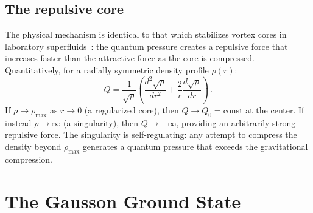 \documentclass[12pt, a4paper]{article}
\begin{document}
\subsection{The repulsive core}

The physical mechanism is identical to that which stabilizes vortex cores in laboratory superfluids~\cite{volovik_2003}: the quantum pressure creates a repulsive force that increases faster than the attractive force as the core is compressed. Quantitatively, for a radially symmetric density profile $\rho(r)$:
\begin{equation}
    Q = \frac{1}{\sqrt{\rho}}\left(
    \frac{d^2\sqrt{\rho}}{dr^2}
    + \frac{2}{r}\frac{d\sqrt{\rho}}{dr}\right)\,.
\end{equation}
If $\rho \to \rho_{\max}$ as $r \to 0$ (a regularized core), then $Q \to Q_0 = \text{const}$ at the center. If instead $\rho \to \infty$ (a singularity), then $Q \to -\infty$, providing an arbitrarily strong repulsive force. The singularity is self-regulating: any attempt to compress the density beyond $\rho_{\max}$ generates a quantum pressure that exceeds the gravitational compression.


\section{The Gausson Ground State}
\label{sec:gausson}
\end{document}
